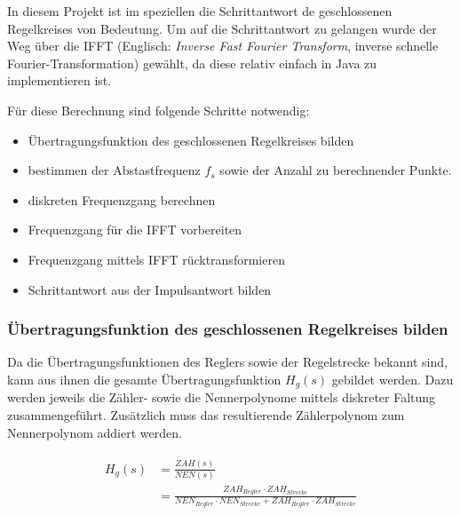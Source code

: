In  diesem  Projekt ist  im  speziellen  die Schrittantwort  de  geschlossenen
Regelkreises von  Bedeutung. Um auf die  Schrittantwort zu gelangen  wurde der
Weg \"uber die IFFT (Englisch:  \emph{Inverse Fast Fourier Transform}, inverse
schnelle Fourier-Transformation)  gew\"ahlt, da diese relativ  einfach in Java
zu implementieren ist.

F\"ur diese Berechnung sind folgende Schritte notwendig:

\begin{itemize}
    \item
        \"Ubertragungsfunktion des geschlossenen Regelkreises bilden
    \item
        bestimmen der Abstastfrequenz $f_s$ sowie der Anzahl zu berechnender Punkte.
    \item
        diskreten Frequenzgang berechnen
    \item
        Frequenzgang f\"ur die IFFT vorbereiten
    \item
        Frequenzgang mittels IFFT r\"ucktransformieren
    \item
        Schrittantwort aus der Impulsantwort bilden
\end{itemize}


\subsubsection*{\"Ubertragungsfunktion des geschlossenen Regelkreises bilden}

Da  die \"Ubertragungsfunktionen  des Reglers  sowie der  Regelstrecke bekannt
sind,  kann aus  ihnen  die gesamte  \"Ubertragungsfunktion $H_g(s)$  gebildet
werden. Dazu  werden jeweils  die Z\"ahler-  sowie die  Nennerpolynome mittels
diskreter  Faltung  zusammengef\"uhrt. Zus\"atzlich   muss  das  resultierende
Z\"ahlerpolynom zum Nennerpolynom addiert werden.

\begin{gather} \label{eq:fft:hg}
    \begin{split}
        H_g(s)  & = \frac{ZAH(s)}{NEN(s)} \\
                & = \frac{ZAH_{Regler} \cdot ZAH_{Strecke}}{NEN_{Regler} \cdot NEN_{Strecke} + ZAH_{Regler} \cdot ZAH_{Strecke}}
    \end{split}
\end{gather}

